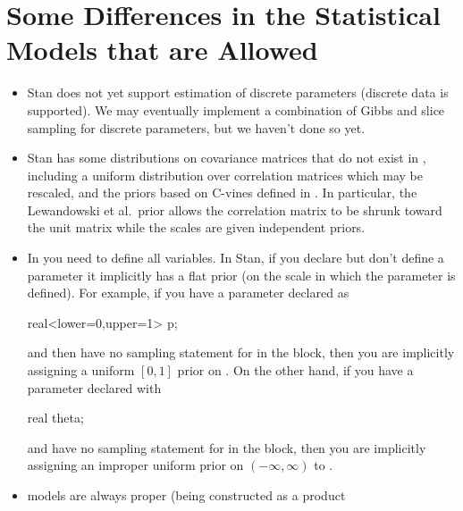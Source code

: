 \section{Some Differences in the Statistical Models that are Allowed}

\begin{itemize}
\item Stan does not yet support estimation of discrete parameters
  (discrete data is supported).  We may eventually implement a
  combination of Gibbs and slice sampling for discrete parameters, but
  we haven't done so yet.
\item Stan has some distributions on covariance matrices that do not
  exist in \BUGS, including a uniform distribution over correlation
  matrices which may be rescaled, and the priors based on C-vines
  defined in \citep{LewandowskiKurowickaJoe:2009}.  In particular, the
  Lewandowski et al.\ prior allows the correlation matrix to be shrunk
  toward the unit matrix while the scales are given independent priors.
\item In \BUGS you need to define all variables.  In Stan, if you
  declare but don't define a parameter it implicitly has a flat prior
  (on the scale in which the parameter is defined).  For example, if
  you have a parameter  declared as 
\begin{stancode}
real<lower=0,upper=1> p;
\end{stancode}
%
and then have no sampling statement for  in the 
block, then you are implicitly assigning a uniform $[0,1]$ prior on
.
On the other hand, if you have a parameter  declared with
%
\begin{stancode}
real theta;
\end{stancode}
%
and have no sampling statement for  in the
 block, 
 then you are implicitly assigning an improper uniform prior
on $(-\infty,\infty)$ to .  
%
\item \BUGS models are always proper (being constructed as a product

\end{itemize}
